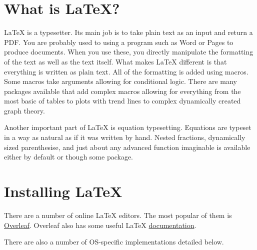 \section{What is \LaTeX?}
\LaTeX{} is a typesetter. Its main job is to take plain text as an input and return a PDF. You are probably used to using a program such as Word or Pages to produce documents. When you use these, you directly manipulate the formatting of the text as well as the text itself. What makes \LaTeX{} different is that everything is written as plain text. All of the formatting is added using macros. Some macros take arguments allowing for conditional logic. There are many packages available that add complex macros allowing for everything from the most basic of tables to plots with trend lines to complex dynamically created graph theory.\par
Another important part of \LaTeX{} is equation typesetting. Equations are typeset in a way as natural as if it was written by hand. Nested fractions, dynamically sized parenthesise, and just about any advanced function imaginable is available either by default or though some package.

\section{Installing \LaTeX}
There are a number of online \LaTeX{} editors. The most popular of them is \href{https://www.overleaf.com}{Overleaf}. Overleaf also has some useful \LaTeX{} \href{https://www.overleaf.com/learn}{documentation}.\par
There are also a number of OS-specific implementations detailed below.

